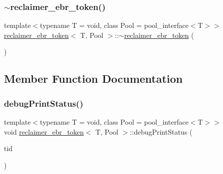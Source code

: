 \mbox{\label{classreclaimer__ebr__token_a03b63c5cdbd9f10543c85e324ab903bf}} 
\subsubsection{\texorpdfstring{$\sim$reclaimer\+\_\+ebr\+\_\+token()}{~reclaimer\_ebr\_token()}}
{\footnotesize\ttfamily template$<$typename T  = void, class Pool  = pool\+\_\+interface$<$\+T$>$$>$ \\
\hyperlink{classreclaimer__ebr__token}{reclaimer\+\_\+ebr\+\_\+token}$<$ T, Pool $>$\+::$\sim$\hyperlink{classreclaimer__ebr__token}{reclaimer\+\_\+ebr\+\_\+token} (\begin{DoxyParamCaption}{ }\end{DoxyParamCaption})\hspace{0.3cm}{\ttfamily [inline]}}



\subsection{Member Function Documentation}
\mbox{\label{classreclaimer__ebr__token_a53348d44f753066411772dfae552f77f}} 
\subsubsection{\texorpdfstring{debug\+Print\+Status()}{debugPrintStatus()}}
{\footnotesize\ttfamily template$<$typename T  = void, class Pool  = pool\+\_\+interface$<$\+T$>$$>$ \\
void \hyperlink{classreclaimer__ebr__token}{reclaimer\+\_\+ebr\+\_\+token}$<$ T, Pool $>$\+::debug\+Print\+Status (\begin{DoxyParamCaption}\item[{const int}]{tid }\end{DoxyParamCaption})\hspace{0.3cm}{\ttfamily [inline]}}

